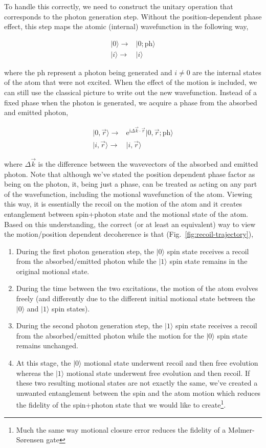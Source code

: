 \documentclass[10pt,fleqn]{article}
\newcommand{\ue}{\mathrm{e}}
\newcommand{\ui}{\mathrm{i}}
\newcommand{\eqar}[1]
{
  \begin{align}
    #1
  \end{align}
}
\begin{document}
To handle this correctly, we need to construct the unitary operation that corresponds
to the photon generation step. Without the position-dependent phase effect,
this step maps the atomic (internal) wavefunction in the following way,
\eqar{
  |0\rangle\rightarrow&|0;\mathrm{ph}\rangle\\
  |i\rangle\rightarrow&|i\rangle
}
where the $\mathrm{ph}$ represent a photon being generated and $i\neq0$
are the internal states of the atom that were not excited.
When the effect of the motion is included, we can still use the classical picture
to write out the new wavefunction.
Instead of a fixed phase when the photon is generated, we acquire a phase
from the absorbed and emitted photon,
\eqar{
  |0,\vec r\rangle\rightarrow&\ue^{\ui\Delta\vec k\cdot\vec r}|0,\vec r;\mathrm{ph}\rangle\\
  |i,\vec r\rangle\rightarrow&|i,\vec r\rangle
}
where $\Delta\vec k$ is the difference between the wavevectors of the absorbed
and emitted photon. Note that although we've stated the position dependent phase factor
as being on the photon, it, being just a phase, can be treated as acting on any part
of the wavefunction, including the motional wavefunction of the atom.
Viewing this way, it is essentially the recoil on the motion of the atom
and it creates entanglement between spin+photon state
and the motional state of the atom.\\

Based on this understanding, the correct (or at least an equivalent) way
to view the motion/position dependent decoherence is that (Fig.~\ref{fig:recoil-trajectory}),
\begin{enumerate}
\item During the first photon generation step, the $|0\rangle$ spin state
  receives a recoil from the absorbed/emitted photon while the $|1\rangle$ spin state
  remains in the original motional state.
\item During the time between the two excitations,
  the motion of the atom evolves freely (and differently
  due to the different initial motional state
  between the $|0\rangle$ and $|1\rangle$ spin states).
\item During the second photon generation step, the $|1\rangle$ spin state
  receives a recoil from the absorbed/emitted photon while the motion for the
  $|0\rangle$ spin state remains unchanged.
\item At this stage, the $|0\rangle$ motional state underwent
  recoil and then free evolution
  whereas the $|1\rangle$ motional state underwent free evolution and then recoil.
  If these two resulting motional states are not exactly the same,
  we've created a unwanted entanglement between the spin and the atom motion
  which reduces the fidelity of the spin+photon state that we would like to create\footnote{Much the same way motional closure error reduces the fidelity of a M{\o}lmer-S{\o}rensen gate}.
\end{enumerate}
\end{document}
